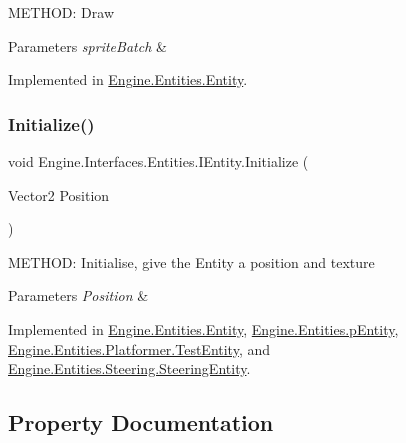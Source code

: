 M\+E\+T\+H\+OD\+: Draw 


\begin{DoxyParams}{Parameters}
{\em sprite\+Batch} & \\
\hline
\end{DoxyParams}


Implemented in \hyperlink{a00314_a5c795930028c5672b54f95369b25019f}{Engine.\+Entities.\+Entity}.

\mbox{\label{a00438_a0c80525509aaeaa0d78eef908f7f7553}} 
\subsubsection{\texorpdfstring{Initialize()}{Initialize()}}
{\footnotesize\ttfamily void Engine.\+Interfaces.\+Entities.\+I\+Entity.\+Initialize (\begin{DoxyParamCaption}\item[{Vector2}]{Position }\end{DoxyParamCaption})}



M\+E\+T\+H\+OD\+: Initialise, give the Entity a position and texture 


\begin{DoxyParams}{Parameters}
{\em Position} & \\
\hline
\end{DoxyParams}


Implemented in \hyperlink{a00314_aa1425aeeac379c5141e7560b84850b3d}{Engine.\+Entities.\+Entity}, \hyperlink{a00322_aad953baa984c0f958d3e96efbfc3bca9}{Engine.\+Entities.\+p\+Entity}, \hyperlink{a00330_ad4122c4f38d98746a67532d0a6836da5}{Engine.\+Entities.\+Platformer.\+Test\+Entity}, and \hyperlink{a00342_a7b1e3df5320c999d2cf1cc3b97994401}{Engine.\+Entities.\+Steering.\+Steering\+Entity}.



\subsection{Property Documentation}
\mbox{\label{a00438_a0c45df802f74c4910b8e7a0842cfbcd2}} 
